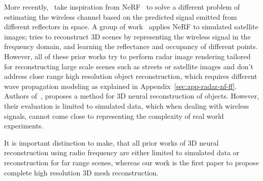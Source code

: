More recently,~\cite{lu2024newrf, zhao2023nerf2, chen2024radio} take inspiration from NeRF~\cite{mildenhall2021nerf} to solve a different problem of estimating the wireless channel based on the predicted signal emitted from different reflectors in space. A group of work~\cite{barbierrenard2025multiview3dsurfacereconstruction, tan2024fast} applies NeRF to simulated satellite images;
\cite{borts2024radar,huang2024dart} tries to reconstruct 3D scenes by representing the wireless signal in the frequency domain, and learning the reflectance and occupancy of different points. However, all of these prior works try to perform radar image rendering tailored for reconstructing large scale scenes such as streets or satellite images and don't address close range high resolution object reconstruction, which requires different wave propagation modeling as explained in Appendix~\ref{sec:app-radar-nf-ff}.
Authors of~\cite{takawale2025spinr}, proposes a method for 3D neural reconstruction of objects. However, their evaluation is limited to simulated data, which when dealing with wireless signals, cannot come close to representing the complexity of real world experiments.

It is important distinction to make, that all prior works of 3D neural reconstruction using radio frequency are either limited to simulated data or reconstruction for far range scenes, whereas our work is the first paper to propose complete high resolution 3D mesh reconstruction.
